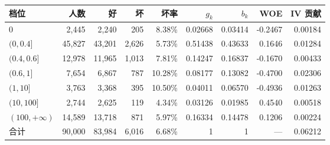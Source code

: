 \begin{tabular}{lrrrrrrrr}
\toprule
档位 & 人数 & 好 & 坏 & 坏率 & $g_k$ & $b_k$ & WOE & IV 贡献 \\
\midrule
$0$ & 2,445 & 2,240 & 205 & 8.38\% & 0.02668 & 0.03414 & -0.2467 & 0.00184 \\
$(0,0.4]$ & 45,827 & 43,201 & 2,626 & 5.73\% & 0.51438 & 0.43633 & 0.1646 & 0.01284 \\
$(0.4,0.6]$ & 12,978 & 11,965 & 1,013 & 7.81\% & 0.14247 & 0.16837 & -0.1670 & 0.00433 \\
$(0.6,1]$ & 7,654 & 6,867 & 787 & 10.28\% & 0.08177 & 0.13082 & -0.4700 & 0.02306 \\
$(1,10]$ & 3,763 & 3,368 & 395 & 10.50\% & 0.04011 & 0.06570 & -0.4936 & 0.01263 \\
$(10,100]$ & 2,744 & 2,625 & 119 & 4.34\% & 0.03126 & 0.01985 & 0.4540 & 0.00518 \\
$(100,+\infty)$ & 14,589 & 13,718 & 871 & 5.97\% & 0.16334 & 0.14478 & 0.1206 & 0.00224 \\
\midrule
合计 & 90,000 & 83,984 & 6,016 & 6.68\% & 1 & 1 & --- & 0.06212 \\
\bottomrule
\end{tabular}
